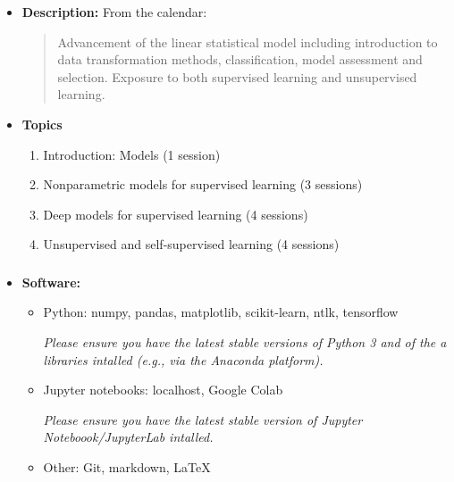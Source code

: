 \documentclass[xcolor={dvipsnames}]{beamer}
\begin{document}
\begin{frame}
    \begin{itemize}
        \setlength\parskip{1em}
        \item \textbf{Description:} From the calendar:

        \bigskip
        \begin{quote}
        Advancement of the linear statistical model including introduction to data
        transformation methods, classification, model assessment and selection.
        Exposure to both supervised learning and unsupervised learning.
    \end{quote}

    \item \textbf{Topics}
    \begin{enumerate}
        \setlength\parskip{0.5em}
        \item Introduction: Models (1 session)
        \item Nonparametric models for supervised learning (3 sessions)
        \item Deep models for supervised learning (4 sessions)
        \item Unsupervised and self-supervised learning (4 sessions)
    \end{enumerate}
\end{itemize}
\end{frame}

\begin{frame}
    \frametitle{}

    \begin{itemize}
        \setlength\parskip{1em}
        \item \textbf{Software:}
        \begin{itemize}
            \setlength\parskip{1em}
            \item Python: numpy, pandas, matplotlib, scikit-learn, ntlk, tensorflow
            
            \emph{Please ensure you have the latest stable versions of Python 3 and of the a libraries intalled (e.g., via the Anaconda platform).}
            \item Jupyter notebooks: localhost, Google Colab
            
            \emph{Please ensure you have the latest stable version of Jupyter Noteboook/JupyterLab intalled.}
            
            \item Other: Git, markdown, \LaTeX
        \end{itemize}
    \end{itemize}
\end{frame}
\end{document}
